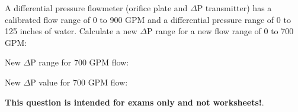 

A differential pressure flowmeter (orifice plate and $\Delta$P transmitter) has a calibrated flow range of 0 to 900 GPM and a differential pressure range of 0 to 125 inches of water.  Calculate a new $\Delta$P range for a new flow range of 0 to 700 GPM:

\vskip 10pt

New $\Delta$P range for 700 GPM flow: \underbar{\hskip 50pt}







New $\Delta$P value for 700 GPM flow: 







{\bf This question is intended for exams only and not worksheets!}.



